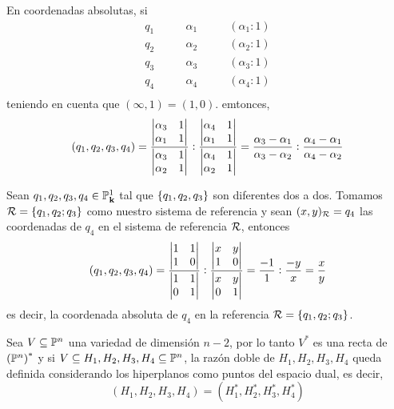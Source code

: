 \begin{obs}
  En coordenadas absolutas, si 
  \[
    \begin{aligned}
      q_1 &\qquad \alpha_1 &\qquad (\alpha_1:1) \\
      q_2 &\qquad \alpha_2 &\qquad (\alpha_2:1) \\
      q_3 &\qquad \alpha_3 &\qquad (\alpha_3:1) \\
      q_4 &\qquad \alpha_4 &\qquad (\alpha_4:1) \\
    \end{aligned}
  \]
  teniendo en cuenta que $(\infty,1) = (1,0)$. emtonces, 
  \[
    \left( q_1,q_2,q_3,q_4 \right) = \frac{\begin{vmatrix}\alpha_3 & 1 \\ \alpha_1 & 1\end{vmatrix}}
    {\begin{vmatrix}\alpha_3 & 1 \\ \alpha_2 & 1\end{vmatrix}}:\frac{\begin{vmatrix}\alpha_4 & 1 \\ \alpha_1 & 1\end{vmatrix}}
    {\begin{vmatrix}\alpha_4 & 1 \\ \alpha_2 & 1\end{vmatrix}} = 
    \frac{\alpha_3-\alpha_1}{\alpha_3-\alpha_2}:\frac{\alpha_4-\alpha_1}{\alpha_4-\alpha_2}
  \]
\end{obs}
\begin{obs}\label{obs:rzdo_ref}
  Sean $q_1,q_2,q_3,q_4 \in \mathbb{P}^1_{\mathbf{k}}$ tal que $\left\{q_1,q_2,q_3\right\}$ son diferentes dos a dos.
  Tomamos $\mathcal{R} = \left\{q_1,q_2;q_3\right\}$ como nuestro sistema de referencia y sean $(x,y)_{\mathcal{R}} = q_4$ 
  las coordenadas de $q_4$ en el sistema de referencia $\mathcal{R}$, entonces
  \[
    \left( q_1,q_2,q_3,q_4 \right) = \frac{\begin{vmatrix}1 & 1 \\ 1 & 0\end{vmatrix}}
    {\begin{vmatrix}1 & 1 \\ 0 & 1\end{vmatrix}}:\frac{\begin{vmatrix}x & y \\ 1 & 0\end{vmatrix}}
    {\begin{vmatrix}x & y \\ 0 & 1\end{vmatrix}} = \frac{-1}{1}:\frac{-y}{x} = \frac{x}{y}
  \]
  es decir, la coordenada absoluta de $q_4$ en la referencia $\mathcal{R} = \left\{q_1,q_2;q_3\right\}$.
\end{obs}
\begin{obs}
 Sea $V \subseteq \mathbb{P}^n$ una variedad de dimensión $n-2$, por lo tanto $V^*$ es una recta de
 $\left( \mathbb{P}^n \right)^*$ y si $V \subseteq H_1,H_2,H_3,H_4 \subseteq \mathbb{P}^n$, la razón doble
 de $H_1,H_2,H_3,H_4$ queda definida considerando los hiperplanos como puntos del espacio dual,
 es decir,
 \[
  (H_1,H_2,H_3,H_4) = (H_1^*,H_2^*,H_3^*,H_4^*)
 \]
\end{obs}

